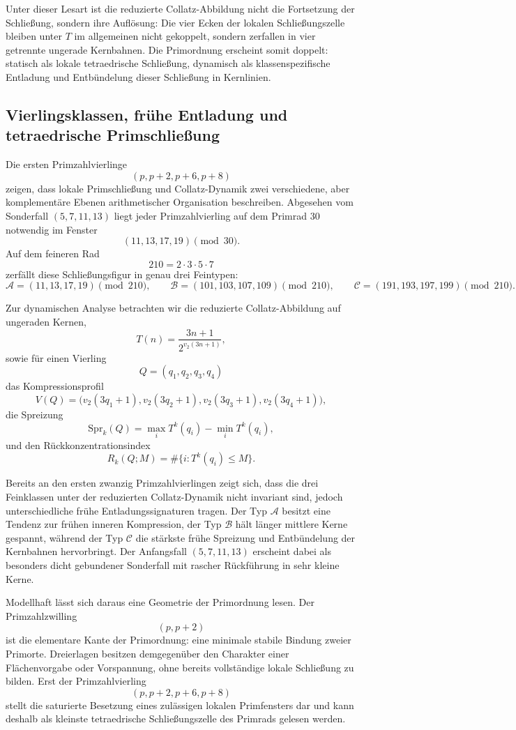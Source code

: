 \documentclass[11pt,a4paper]{article}
\theoremstyle{definition}
\begin{document}
Unter dieser Lesart ist die reduzierte Collatz-Abbildung nicht die
Fortsetzung der Schlie\ss ung, sondern ihre Aufl\"osung: Die vier Ecken
der lokalen Schlie\ss ungszelle bleiben unter $T$ im allgemeinen nicht
gekoppelt, sondern zerfallen in vier getrennte ungerade Kernbahnen.
Die Primordnung erscheint somit doppelt: statisch als lokale
tetraedrische Schlie\ss ung, dynamisch als klassenspezifische Entladung
und Entb\"undelung dieser Schlie\ss ung in Kernlinien.

\subsection{Vierlingsklassen, fr\"uhe Entladung und tetraedrische Primschlie\ss ung}

Die ersten Primzahlvierlinge
\[
(p,p+2,p+6,p+8)
\]
zeigen, dass lokale Primschlie\ss ung und Collatz-Dynamik zwei verschiedene,
aber komplement\"are Ebenen arithmetischer Organisation beschreiben.
Abgesehen vom Sonderfall $(5,7,11,13)$ liegt jeder Primzahlvierling auf
dem Primrad $30$ notwendig im Fenster
\[
(11,13,17,19)\pmod{30}.
\]
Auf dem feineren Rad
\[
210=2\cdot 3\cdot 5\cdot 7
\]
zerf\"allt diese Schlie\ss ungsfigur in genau drei Feintypen:
\[
\mathcal A=(11,13,17,19)\pmod{210},\qquad
\mathcal B=(101,103,107,109)\pmod{210},\qquad
\mathcal C=(191,193,197,199)\pmod{210}.
\]

Zur dynamischen Analyse betrachten wir die reduzierte Collatz-Abbildung
auf ungeraden Kernen,
\[
T(n)=\frac{3n+1}{2^{v_2(3n+1)}},
\]
sowie f\"ur einen Vierling
\[
Q=(q_1,q_2,q_3,q_4)
\]
das Kompressionsprofil
\[
V(Q)=\bigl(v_2(3q_1+1),v_2(3q_2+1),v_2(3q_3+1),v_2(3q_4+1)\bigr),
\]
die Spreizung
\[
\mathrm{Spr}_k(Q)=\max_i T^k(q_i)-\min_i T^k(q_i),
\]
und den R\"uckkonzentrationsindex
\[
R_k(Q;M)=\#\{i:T^k(q_i)\le M\}.
\]

Bereits an den ersten zwanzig Primzahlvierlingen zeigt sich, dass die drei
Feinklassen unter der reduzierten Collatz-Dynamik nicht invariant sind,
jedoch unterschiedliche fr\"uhe Entladungssignaturen tragen. Der Typ
$\mathcal A$ besitzt eine Tendenz zur fr\"uhen inneren Kompression, der
Typ $\mathcal B$ h\"alt l\"anger mittlere Kerne gespannt, w\"ahrend der
Typ $\mathcal C$ die st\"arkste fr\"uhe Spreizung und Entb\"undelung der
Kernbahnen hervorbringt. Der Anfangsfall $(5,7,11,13)$ erscheint dabei als
besonders dicht gebundener Sonderfall mit rascher R\"uckf\"uhrung in sehr
kleine Kerne.

Modellhaft l\"asst sich daraus eine Geometrie der Primordnung lesen.
Der Primzahlzwilling
\[
(p,p+2)
\]
ist die elementare Kante der Primordnung: eine minimale stabile Bindung
zweier Primorte. Dreierlagen besitzen demgegen\"uber den Charakter einer
Fl\"achenvorgabe oder Vorspannung, ohne bereits vollst\"andige lokale
Schlie\ss ung zu bilden. Erst der Primzahlvierling
\[
(p,p+2,p+6,p+8)
\]
stellt die saturierte Besetzung eines zul\"assigen lokalen Primfensters
dar und kann deshalb als kleinste tetraedrische Schlie\ss ungszelle des
Primrads gelesen werden.
\end{document}
